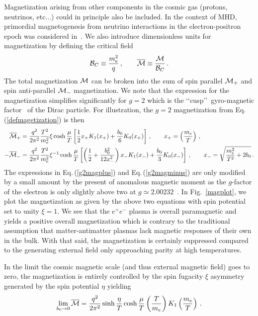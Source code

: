 \documentclass[a4paper]{article}
\newcommand{\req}[1]{Eq.\,(\ref{#1})}
\newcommand{\rf}[1]{Fig.~{\ref{#1}}}
\begin{document}
Magnetization arising from other components in the cosmic gas (protons, neutrinos, etc...) could in principle also be included. In the context of MHD, primordial magnetogenesis from neutrino interactions in the electron-positron epoch was considered in~\cite{perrone2021neutrinoelectron}. We also introduce dimensionless units for magnetization by defining the critical field
\begin{align}
    {\cal B}_{C}\equiv\frac{m_{e}^{2}}{q}\,,\qquad{\overline{\cal M}}\equiv\frac{\cal M}{{\cal B}_{C}}\,.
\end{align}
The total magnetization ${\cal M}$ can be broken into the sum of spin parallel ${\cal M}_{+}$ and spin anti-parallel ${\cal M}_{-}$ magnetization. We note that the expression for the magnetization simplifies significantly for $g=2$ which is the \lq\lq cusp\rq\rq\ gyro-magnetic factor~\cite{rafelski2022study} of the Dirac particle. For illustration, the $g=2$ magnetization from \req{defmagetization} is then
\begin{align}
    \label{g2magplus}
    {\overline{\cal M}}_{+}&=\frac{q^{2}}{2\pi^{2}}\frac{T^{2}}{m_{e}^{2}}\xi\cosh{\frac{\mu}{T}}\left[\frac{1}{2}x_{+}K_{1}(x_{+})+\frac{b_{0}}{6}K_{0}(x_{+})\right]\,,\qquad x_{+}=\left(\frac{m_{e}}{T}\right)\,,\\
    \label{g2magminus}
    -{\overline{\cal M}}_{-}&=\frac{q^{2}}{2\pi^{2}}\frac{T^{2}}{m_{e}^{2}}\xi^{-1}\cosh{\frac{\mu}{T}}\left[\left(\frac{1}{2}+\frac{b_{0}^{2}}{12x_{-}^{2}}\right)x_{-}K_{1}(x_{-})+\frac{b_{0}}{3}K_{0}(x_{-})\right]\,,\qquad x_{-}=\sqrt{\frac{m_{e}^{2}}{T^{2}}+2b_{0}}\,.
\end{align}
The expressions in \req{g2magplus} and \req{g2magminus} are only modified by a small amount by the present of anomalous magnetic moment as the $g$-factor of the electron is only slightly above two at $g\simeq2.00232$~\cite{tiesinga2021codata}. In \rf{magplot}, we plot the magnetization as given by the above two equations with spin potential set to unity $\xi=1$. We see that the $e^{+}e^{-}$ plasma is overall paramagnetic and yields a positive overall magnetization which is contrary to the traditional assumption that matter-antimatter plasmas lack magnetic responses of their own in the bulk. With that said, the magnetization is certainly suppressed compared to the generating external field only approaching parity at high temperatures.

In the limit the cosmic magnetic scale (and thus external magnetic field) goes to zero, the magnetization is entirely controlled by the spin fugacity $\xi$ asymmetry generated by the spin potential $\eta$ yielding
\begin{align}
    \lim_{b_{0}\rightarrow0}{\overline{\cal M}}=\frac{q^{2}}{2\pi^{2}}\sinh{\frac{\eta}{T}}\cosh{\frac{\mu}{T}}\left(\frac{T}{m_{e}}\right)K_{1}\left(\frac{m_{e}}{T}\right)\,.
\end{align}
\end{document}

